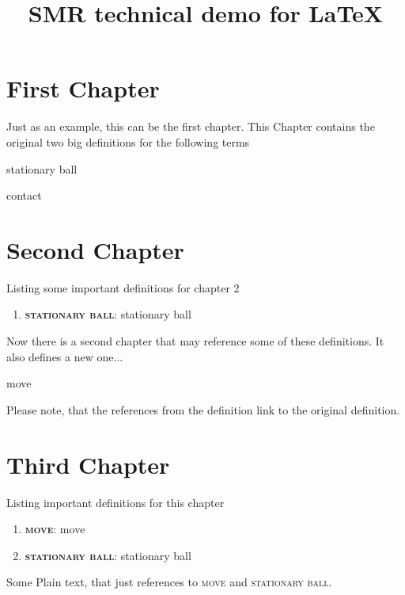 \documentclass[fontsize=11pt, paper=a4]{report}
\newcommand{\refformat}[1]{{\textsc{#1}}}			 %
\newcommand{\defformat}[1]{{\textbf{\refformat{#1}}}}%
\newcommand{\dtterm}[1]{
\begin{Definition}[name=\defformat{#1}]
	 \glsdesc{#1}
\end{Definition}
}
\newcommand{\tref}[1]{\refformat{\gls{#1}}}
\newcommand{\tterm}[1]{
	\defformat{#1}: \glsdesc{#1}
}
\begin{document}
\title{SMR technical demo for \LaTeX}
\maketitle

\pagestyle{plain}%
\chapter*{First Chapter}
Just as an example, this can be the first chapter. This Chapter contains the original two big definitions for the following terms
\dtterm{stationary ball}
\dtterm{contact}

\newpage
\chapter*{Second Chapter}
Listing some important definitions for chapter 2
\begin{enumerate}
	\item{\tterm{stationary ball}}
\end{enumerate}
Now there is a second chapter that may reference some of these definitions. It also defines a new one...
\dtterm{move}
Please note, that the references from the definition link to the original definition.

\newpage
\chapter*{Third Chapter}
Listing important definitions for this chapter
\begin{enumerate}
	\item{\tterm{move}}
	\item{\tterm{stationary ball}}
\end{enumerate}
Some Plain text, that just references to \tref{move} and \tref{stationary ball}.

\clearpage

\printglossary[title=Definitions, toctitle=List of terms, nonumberlist]
\end{document}
